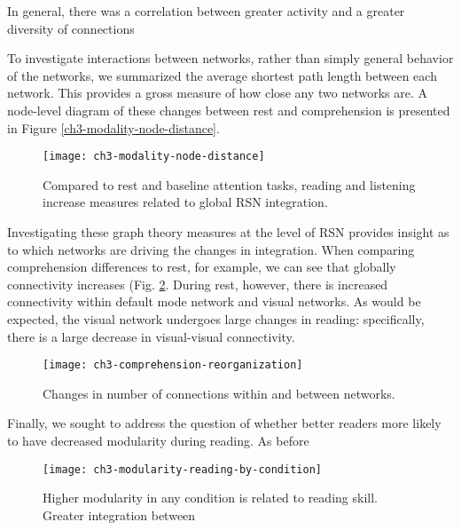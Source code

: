 In general, there was a correlation between greater activity and a greater diversity of connections


To investigate interactions between networks, rather than simply general behavior of the networks, we summarized the average shortest path length between each network. This provides a gross measure of how close any two networks are. A node-level diagram of these changes between rest and comprehension is presented in Figure \ref{ch3-modality-node-distance}. 

\begin{figure}[t]
	\centering
	\texttt{[image: ch3-modality-node-distance]}
    \caption[Language induces more integrated global network architecture.]{Compared to rest and baseline attention tasks, reading and listening increase measures related to global RSN integration.}
	\label{fig:ch3-modality-node-distance}
\end{figure}

Investigating these graph theory measures at the level of RSN provides  insight as to which networks are driving the changes in integration. When comparing comprehension differences to rest, for example, we can see that globally connectivity increases (Fig. \ref{fig:ch3-comprehension-reorganization}. During rest, however, there is increased connectivity within default mode network and visual networks. As would be expected, the visual network undergoes large changes in reading: specifically, there is a large decrease in visual-visual connectivity. 

\begin{figure}[t]
	\centering
	\texttt{[image: ch3-comprehension-reorganization]}
    \caption[Changes in number of connections within and between networks.]{Changes in number of connections within and between networks.}
	\label{fig:ch3-comprehension-reorganization}
\end{figure}

Finally, we sought to address the question of whether better readers more likely to have decreased modularity during reading. As before 

\begin{figure}[t]
	\centering
	\texttt{[image: ch3-modularity-reading-by-condition]}
    \caption[Higher modularity in any condition is related to reading skill.]{Higher modularity in any condition is related to reading skill. Greater integration between}
	\label{fig:ch3-modularity-reading-by-condition}
\end{figure}


